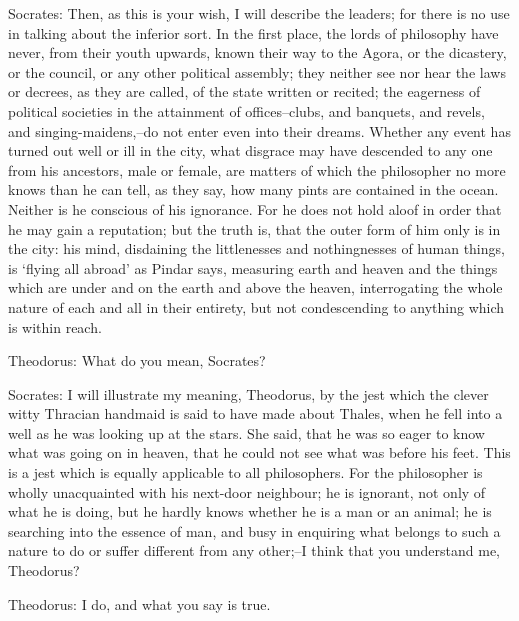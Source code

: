 Socrates: Then, as this is your wish, I will describe the leaders; for
there is no use in talking about the inferior sort. In the first place,
the lords of philosophy have never, from their youth upwards, known
their way to the Agora, or the dicastery, or the council, or any other
political assembly; they neither see nor hear the laws or decrees,
as they are called, of the state written or recited; the eagerness of
political societies in the attainment of offices--clubs, and banquets,
and revels, and singing-maidens,--do not enter even into their dreams.
Whether any event has turned out well or ill in the city, what disgrace
may have descended to any one from his ancestors, male or female, are
matters of which the philosopher no more knows than he can tell, as they
say, how many pints are contained in the ocean. Neither is he conscious
of his ignorance. For he does not hold aloof in order that he may gain a
reputation; but the truth is, that the outer form of him only is in the
city: his mind, disdaining the littlenesses and nothingnesses of human
things, is `flying all abroad' as Pindar says, measuring earth and
heaven and the things which are under and on the earth and above
the heaven, interrogating the whole nature of each and all in their
entirety, but not condescending to anything which is within reach.

Theodorus: What do you mean, Socrates?

Socrates: I will illustrate my meaning, Theodorus, by the jest which the
clever witty Thracian handmaid is said to have made about Thales, when
he fell into a well as he was looking up at the stars. She said, that he
was so eager to know what was going on in heaven, that he could not see
what was before his feet. This is a jest which is equally applicable to
all philosophers. For the philosopher is wholly unacquainted with his
next-door neighbour; he is ignorant, not only of what he is doing, but
he hardly knows whether he is a man or an animal; he is searching into
the essence of man, and busy in enquiring what belongs to such a nature
to do or suffer different from any other;--I think that you understand
me, Theodorus?

Theodorus: I do, and what you say is true.


